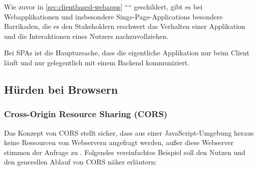 Wie zuvor in \autoref{sec:clientbased-webapps} ```` geschildert, gibt es bei Webapplikationen und insbesondere Singe-Page-Applications besondere Barrikaden, die es den Stakeholdern erschwert das Verhalten einer Applikation und die Interaktionen eines Nutzers nachzuvollziehen.
	
Bei SPAs ist die Hauptursache, dass die eigentliche Applikation nur beim Client läuft und nur gelegentlich mit einem Backend kommuniziert.
	


\subsection{Hürden bei Browsern}


\subsubsection{Cross-Origin Resource Sharing (CORS)}

Das Konzept von CORS stellt sicher, dass aus einer JavaScript-Umgebung heraus keine Ressourcen von Webservern angefragt werden, außer diese Webserver stimmen der Anfrage zu \cite{MDNCORS}. Folgendes vereinfachtes Beispiel soll den Nutzen und den generellen Ablauf von CORS näher erläutern:

